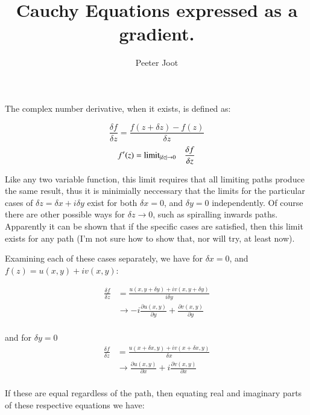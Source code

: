 \documentclass{article}
\title{ Cauchy Equations expressed as a gradient. }
\author{Peeter Joot}
\date{}        %
\begin{document}
\maketitle{}

\section{}

The complex number derivative, when it exists, is defined as:

\begin{equation*}
\frac{\delta f}{\delta z} = \frac{ f(z + \delta z) - f(z)}{\delta z}
\end{equation*}
\begin{equation*}
f'(z) = {\text{limit}}_{\lvert{\delta z}\rvert \rightarrow 0} \quad \frac{\delta f}{\delta z}
\end{equation*}

Like any two variable function, this limit requires that all limiting paths produce the same result, thus it is
minimially neccessary that the limits for the particular cases of $\delta z = \delta x + i \delta y$ exist for both
$\delta x = 0$, and $\delta y = 0$ independently.  Of course there are other possible ways for $\delta z \rightarrow 0$, such as spiralling inwards paths.  Apparently it can be shown that if the specific cases are satisfied, then this limit exists for any path (I'm not sure how to show that, nor will try, at least now).

Examining each of these cases separately, we have for $\delta x = 0$, and $f(z) = u(x,y) + i v(x,y)$:

\begin{align*}
\frac{\delta f}{\delta z}
&= \frac{u(x,y + \delta y) + i v(x,y + \delta y)}{i\delta y} \\
&\rightarrow -i \frac{\partial u(x,y)}{\partial y} + \frac{\partial v(x,y)}{\partial y} \\
\end{align*}

and for $\delta y = 0$
\begin{align*}
\frac{\delta f}{\delta z}
&= \frac{u(x + \delta x,y) + i v(x + \delta x, y)}{\delta x} \\
&\rightarrow \frac{\partial u(x,y)}{\partial x} + i\frac{\partial v(x,y)}{\partial x} \\
\end{align*}

If these are equal regardless of the path, then equating real and imaginary parts of these respective equations we have:
\end{document}
